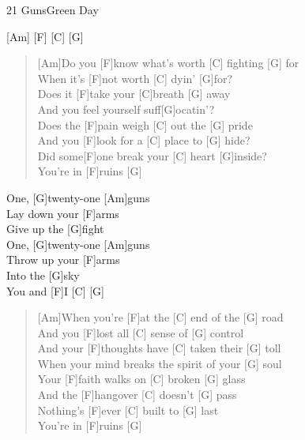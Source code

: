 \begin{song}{21 Guns}{Green Day}

    [Am] [F] [C] [G]

    \begin{verse}
        [Am]Do you [F]know what's worth [C] fighting [G] for \\
        [Am]When it's [F]not worth [C] dyin' [G]for? \\
        [Am]Does it [F]take your [C]breath [G] away \\
        [F]And you feel yourself suff[G]ocatin'? \\
        [Am]Does the [F]pain weigh [C] out the [G] pride \\
        [Am]And you [F]look for a [C] place to [G] hide? \\
        [Am]Did some[F]one break your [C] heart [G]inside? \\
        You're in [F]ruins [G]
    \end{verse}
        
    \begin{chorus}
        [C]One, [G]twenty-one [Am]guns \\
        [G]Lay down your [F]arms \\
        [C]Give up the [G]fight \\
        [C]One, [G]twenty-one [Am]guns \\
        [G]Throw up your [F]arms \\
        [C] Into the [G]sky \\
        You and [F]I [C] [G]
    \end{chorus}
        
    \begin{verse}
        [Am]When you're [F]at the [C] end of the [G] road \\
        [Am]And you [F]lost all [C] sense of [G] control \\
        [Am]And your [F]thoughts have [C] taken their [G] toll \\
        [F]When your mind breaks the spirit of your [G] soul \\
        [Am]Your [F]faith walks on [C] broken [G] glass \\
        [Am]And the [F]hangover [C] doesn't [G] pass \\
        [Am]Nothing's [F]ever [C] built to [G] last \\
        You're in [F]ruins [G]
    \end{verse}
        

\end{song}
